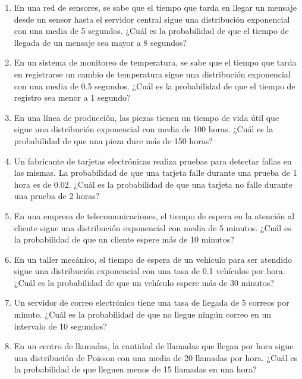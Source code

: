 \begin{Ejer}
\begin{enumerate}
    \item En una red de sensores, se sabe que el tiempo que tarda en llegar un mensaje desde un sensor hasta el servidor central sigue una distribución exponencial con una media de 5 segundos. ¿Cuál es la probabilidad de que el tiempo de llegada de un mensaje sea mayor a 8 segundos?

    \item En un sistema de monitoreo de temperatura, se sabe que el tiempo que tarda en registrarse un cambio de temperatura sigue una distribución exponencial con una media de 0.5 segundos. ¿Cuál es la probabilidad de que el tiempo de registro sea menor a 1 segundo?

    \item En una línea de producción, las piezas tienen un tiempo de vida útil que sigue una distribución exponencial con media de 100 horas. ¿Cuál es la probabilidad de que una pieza dure más de 150 horas?

    \item Un fabricante de tarjetas electrónicas realiza pruebas para detectar fallas en las mismas. La probabilidad de que una tarjeta falle durante una prueba de 1 hora es de 0.02. ¿Cuál es la probabilidad de que una tarjeta no falle durante una prueba de 2 horas?

    \item En una empresa de telecomunicaciones, el tiempo de espera en la atención al cliente sigue una distribución exponencial con media de 5 minutos. ¿Cuál es la probabilidad de que un cliente espere más de 10 minutos?

    \item En un taller mecánico, el tiempo de espera de un vehículo para ser atendido sigue una distribución exponencial con una tasa de 0.1 vehículos por hora. ¿Cuál es la probabilidad de que un vehículo espere más de 30 minutos?

    \item Un servidor de correo electrónico tiene una tasa de llegada de 5 correos por minuto. ¿Cuál es la probabilidad de que no llegue ningún correo en un intervalo de 10 segundos?

    \item En un centro de llamadas, la cantidad de llamadas que llegan por hora sigue una distribución de Poisson con una media de 20 llamadas por hora. ¿Cuál es la probabilidad de que lleguen menos de 15 llamadas en una hora?


\end{enumerate}
\end{Ejer} 


